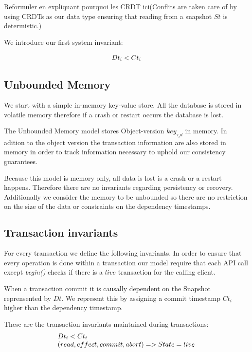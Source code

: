 \documentclass[systeme]{compas2022}
\begin{document}
Reformuler en expliquant pourquoi les CRDT ici(Conflits are taken care of by using CRDTs as our data type ensuring that reading from a snapshot $St$ is determistic.)

We introduce our first system invariant:

\[
  \begin{array}{lcl}
    \emph{$Dt_i < Ct_i$}
  \end{array} 
\]

\subsection{Unbounded Memory}

We start with a simple in-memory key-value store.
All the database is stored in volatile memory therefore if a crash or restart occurs the database is lost.

The Unbounded Memory model stores Object-version $key_{\tau_id}$ in memory.
In adition to the object version the transaction information are also stored in memory in order to track information necessary to uphold our consistency guarantees.

Because this model is memory only, all data is lost is a crash or a restart happens.
Therefore there are no invariants regarding persistency or recovery.
Additionally we consider the memory to be unbounded so there are no restriction on the size of the data or constraints on the dependency timestamps.

\subsection{Transaction invariants}

For every transaction we define the following invariants.
In order to ensure that every operation is done within a transaction our model require that each API call except \emph{begin()} checks if there is a $live$ transaction for the calling client.

When a transaction commit it is causally dependent on the Snapshot reprensented by $Dt$.
We represent this by assigning a commit timestamp $Ct_i$ higher than the dependency timestamp.

These are the transaction invariants maintained during transactions:
\[
  \begin{array}{lcl}
    \emph{$Dt_i < Ct_i$}\\
    \emph{$(read, effect, commit, abort) => State = live$}
  \end{array} 
\]
\end{document}
